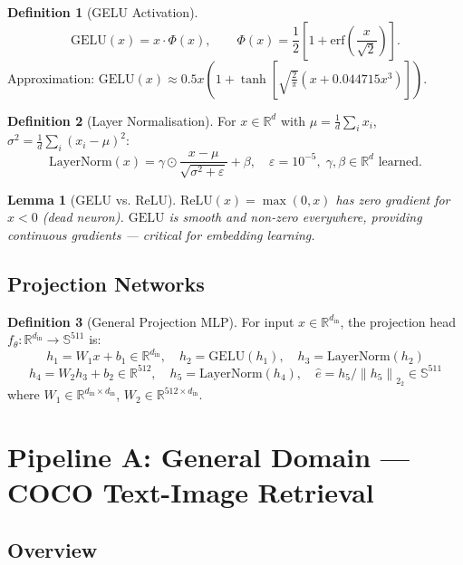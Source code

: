 \documentclass[12pt,a4paper]{article}
\theoremstyle{definition}
\newtheorem{definition}{Definition}[section]
\theoremstyle{plain}
\newtheorem{lemma}[theorem]{Lemma}
\theoremstyle{remark}
\newcommand{\R}{\mathbb{R}}
\newcommand{\Sph}{\mathbb{S}}
\newcommand{\Norm}[1]{\left\|#1\right\|_2}
\newcommand{\LN}{\mathrm{LayerNorm}}
\newcommand{\GELU}{\mathrm{GELU}}
\begin{document}
\begin{definition}[GELU Activation]
\[
  \GELU(x) = x \cdot \Phi(x), \qquad \Phi(x) = \frac{1}{2}\left[1 + \text{erf}\!\left(\frac{x}{\sqrt{2}}\right)\right].
\]
Approximation: $\GELU(x) \approx 0.5x\!\left(1 + \tanh\!\left[\sqrt{\tfrac{2}{\pi}}\left(x + 0.044715x^3\right)\right]\right)$.
\end{definition}

\begin{definition}[Layer Normalisation]
For $x \in \R^d$ with $\mu = \frac{1}{d}\sum_i x_i$, $\sigma^2 = \frac{1}{d}\sum_i (x_i - \mu)^2$:
\[
  \LN(x) = \gamma \odot \frac{x - \mu}{\sqrt{\sigma^2 + \varepsilon}} + \beta, \quad \varepsilon = 10^{-5},\; \gamma, \beta \in \R^d \text{ learned.}
\]
\end{definition}

\begin{lemma}[GELU vs. ReLU]
$\text{ReLU}(x) = \max(0,x)$ has zero gradient for $x < 0$ (dead neuron). $\GELU$ is smooth and non-zero everywhere, providing continuous gradients — critical for embedding learning.
\end{lemma}

\subsection{Projection Networks}

\begin{definition}[General Projection MLP]
\label{def:projmlp}
For input $x \in \R^{d_{\text{in}}}$, the projection head $f_\theta : \R^{d_{\text{in}}} \to \Sph^{511}$ is:
\[
  h_1 = W_1 x + b_1 \in \R^{d_{\text{in}}}, \quad h_2 = \GELU(h_1), \quad h_3 = \LN(h_2)
\]
\[
  h_4 = W_2 h_3 + b_2 \in \R^{512}, \quad h_5 = \LN(h_4), \quad \hat{e} = h_5 / \Norm{h_5}_2 \in \Sph^{511}
\]
where $W_1 \in \R^{d_{\text{in}} \times d_{\text{in}}}$, $W_2 \in \R^{512 \times d_{\text{in}}}$.
\end{definition}

\newpage
\section{Pipeline A: General Domain — COCO Text-Image Retrieval}
\label{sec:pipelineA}

\subsection{Overview}
\end{document}
